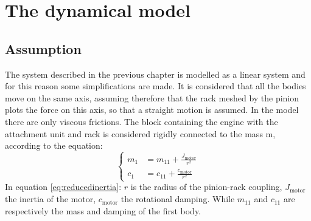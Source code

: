 \section{The dynamical model}
\label{sec:dynamicalmodel}

\subsection{Assumption}
\label{subsec:assumption}
The system described in the previous chapter is modelled as a linear system and
for this reason some simplifications are made.
It is considered that all the bodies move on the same axis, assuming therefore
that the rack meshed by the pinion plots the force on this axis, so that a
straight motion is assumed.
In the model there are only viscous frictions.
The block containing the engine with the attachment unit and rack is considered
rigidly connected to the mass m, according to the equation:
\begin{equation}
	\label{eq:reducedinertia}
	\begin{cases}
		m_{1} &=  m_{11} + \frac{J_{\text{motor}}}{r^2}\\
		c_{1} &=  c_{11} + \frac{c_{\text{motor}}}{r^2}
	\end{cases}
\end{equation}
In equation \eqref{eq:reducedinertia}: $r$ is the radius of the pinion-rack
coupling, $J_{\text{motor}}$ the inertia of the motor, $c_{\text{motor}}$ the
rotational damping.
While $m_{11}$ and $c_{11}$ are respectively the mass and damping of the first body.
%
